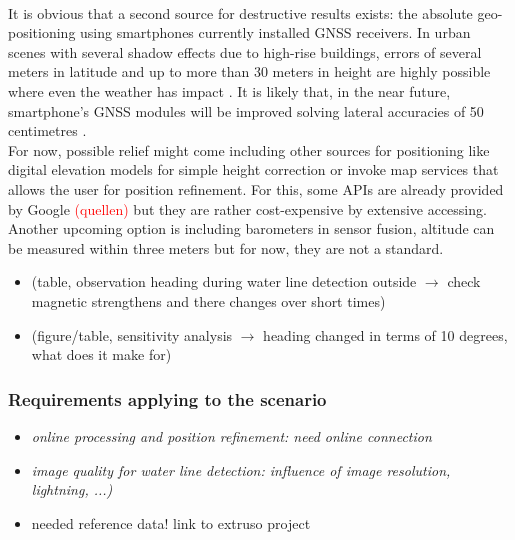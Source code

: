 \documentclass[review]{elsarticle}
\begin{document}
\\It is obvious that a second source for destructive results exists: the absolute geo-positioning using smartphones currently installed GNSS receivers. In urban scenes with several shadow effects due to high-rise buildings, errors of several meters in latitude and up to more than 30 meters in height are highly possible where even the weather has impact \cite{Bauer2013, Blum2013, Zandbergen2011}. It is likely that, in the near future, smartphone's GNSS modules will be improved solving lateral accuracies of 50 centimetres \cite{Moore2017}.\\
For now, possible relief might come including other sources for positioning like digital elevation models for simple height correction or invoke map services that allows the user for position refinement. For this, some APIs are already provided by Google \textcolor{red}{(quellen)} but they are rather cost-expensive by extensive accessing. Another upcoming option is including barometers in sensor fusion, altitude can be measured within three meters \cite{Liu2014} but for now, they are not a standard.

\begin{itemize}
\item(table, observation heading during water line detection outside $\rightarrow$ check magnetic strengthens and there changes over short times)
\item (figure/table, sensitivity analysis  $\rightarrow$ heading changed in terms of 10 degrees, what does it make for)
\end{itemize}

\subsubsection{Requirements applying to the scenario}
\label{sec:water_level_gauging_requirements_situation}

\begin{itemize}
\item \textit{online processing and position refinement: need online connection}
\item \textit{image quality for water line detection: influence of image resolution, lightning, ...)}
\item needed reference data! link to extruso project
\end{itemize}

\end{document}
